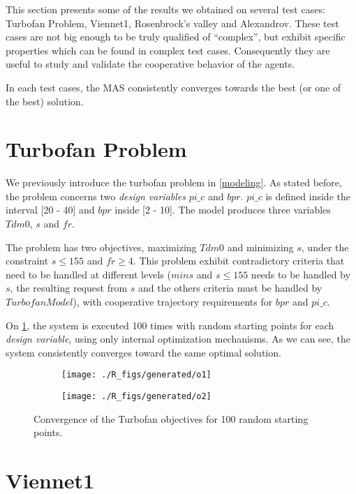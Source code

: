 This section presents some of the results we obtained on several test cases: Turbofan Problem, Viennet1, Rosenbrock's valley and Alexandrov. These test cases are not big enough to be truly qualified of \enquote{complex}, but exhibit specific properties which can be found in complex test cases. Consequently they are useful to study and validate the cooperative behavior of the agents.

In each test cases, the MAS consistently converges towards the best (or one of the best) solution.

\section{Turbofan Problem}

We previously introduce the turbofan problem in \ref{modeling}. As stated before, the problem concerns two \emph{design variables} $pi\_c$ and $bpr$. $pi\_c$ is defined inside the interval [20 - 40] and $bpr$ inside [2 - 10]. The model produces three variables $Tdm0$, $s$ and $fr$.

The problem has two objectives, maximizing $Tdm0$ and minimizing $s$, under the constraint \(s \leq 155\) and \(fr \geq 4\).
This problem exhibit contradictory criteria that need to be handled at different levels ($min s$ and $s \leq 155$ needs to be handled by $s$, the resulting request from $s$ and the others criteria must be handled by $Turbofan Model$), with cooperative trajectory requirements for $bpr$ and $pi\_c$.

On \figurename{} \ref{snecma_res}, the system is executed 100 times with random starting points for each \emph{design variable}, using only internal optimization mechanisms. As we can see, the system consistently converges toward the same optimal solution.

\begin{figure}[h]
	\begin{subfigure}[b]{0.4\textwidth}
		\centering
		\texttt{[image: ./R\_figs/generated/o1]}	
	\end{subfigure}
	\hfill%
	\begin{subfigure}[b]{0.4\textwidth}
		\centering
		\texttt{[image: ./R\_figs/generated/o2]}	
	\end{subfigure}
	\caption{Convergence of the Turbofan objectives for 100 random starting points.}
	\label{snecma_res}
\end{figure}

\section{Viennet1}

